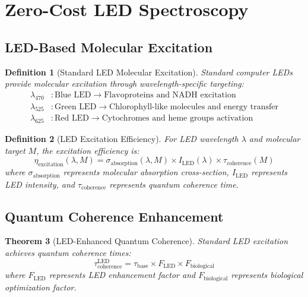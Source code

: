 \documentclass[12pt,a4paper]{article}
\newtheorem{theorem}{Theorem}[section]
\newtheorem{definition}[theorem]{Definition}
\begin{document}
\section{Zero-Cost LED Spectroscopy}

\subsection{LED-Based Molecular Excitation}

\begin{definition}[Standard LED Molecular Excitation]
Standard computer LEDs provide molecular excitation through wavelength-specific targeting:
\begin{align}
\lambda_{470} &: \text{Blue LED} \rightarrow \text{Flavoproteins and NADH excitation} \\
\lambda_{525} &: \text{Green LED} \rightarrow \text{Chlorophyll-like molecules and energy transfer} \\
\lambda_{625} &: \text{Red LED} \rightarrow \text{Cytochromes and heme groups activation}
\end{align}
\end{definition}

\begin{definition}[LED Excitation Efficiency]
For LED wavelength $\lambda$ and molecular target $M$, the excitation efficiency is:
\begin{equation}
\eta_{\text{excitation}}(\lambda, M) = \sigma_{\text{absorption}}(\lambda, M) \times I_{\text{LED}}(\lambda) \times \tau_{\text{coherence}}(M)
\end{equation}
where $\sigma_{\text{absorption}}$ represents molecular absorption cross-section, $I_{\text{LED}}$ represents LED intensity, and $\tau_{\text{coherence}}$ represents quantum coherence time.
\end{definition}

\subsection{Quantum Coherence Enhancement}

\begin{theorem}[LED-Enhanced Quantum Coherence]
Standard LED excitation achieves quantum coherence times:
\begin{equation}
\tau_{\text{coherence}}^{\text{LED}} = \tau_{\text{base}} \times F_{\text{LED}} \times F_{\text{biological}}
\end{equation}
where $F_{\text{LED}}$ represents LED enhancement factor and $F_{\text{biological}}$ represents biological optimization factor.
\end{theorem}
\end{document}
